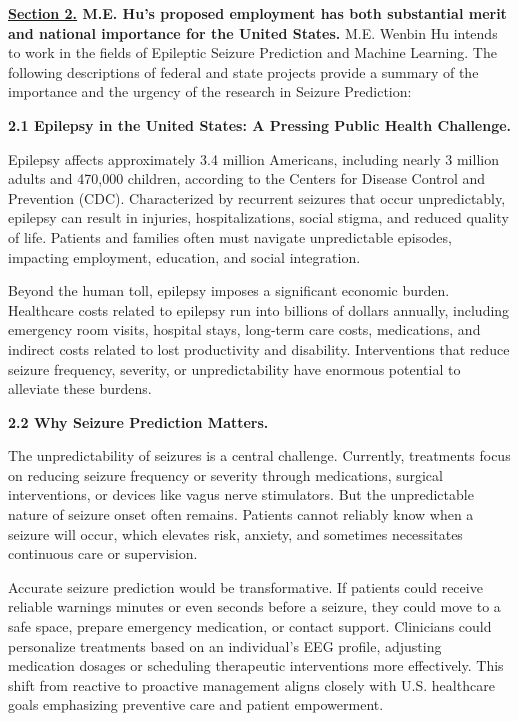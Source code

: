 \documentclass{article}
\begin{document}
\clearpage


{\bf \underline{Section 2.} M.E. Hu’s proposed employment has both substantial merit and national importance for the United States.}
M.E. Wenbin Hu intends to work in the fields of Epileptic Seizure Prediction and Machine Learning. The following descriptions of federal and state projects provide a summary of the importance and the urgency of the research in  Seizure Prediction:

{\bf 2.1 Epilepsy in the United States: A Pressing Public Health Challenge. }

Epilepsy affects approximately 3.4 million Americans, including nearly 3 million adults and 470,000 children, according to the Centers for Disease Control and Prevention (CDC). Characterized by recurrent seizures that occur unpredictably, epilepsy can result in injuries, hospitalizations, social stigma, and reduced quality of life. Patients and families often must navigate unpredictable episodes, impacting employment, education, and social integration.

Beyond the human toll, epilepsy imposes a significant economic burden. Healthcare costs related to epilepsy run into billions of dollars annually, including emergency room visits, hospital stays, long-term care costs, medications, and indirect costs related to lost productivity and disability. Interventions that reduce seizure frequency, severity, or unpredictability have enormous potential to alleviate these burdens.


{\bf 2.2 Why Seizure Prediction Matters. }

The unpredictability of seizures is a central challenge. Currently, treatments focus on reducing seizure frequency or severity through medications, surgical interventions, or devices like vagus nerve stimulators. But the unpredictable nature of seizure onset often remains. Patients cannot reliably know when a seizure will occur, which elevates risk, anxiety, and sometimes necessitates continuous care or supervision.

Accurate seizure prediction would be transformative. If patients could receive reliable warnings minutes or even seconds before a seizure, they could move to a safe space, prepare emergency medication, or contact support. Clinicians could personalize treatments based on an individual’s EEG profile, adjusting medication dosages or scheduling therapeutic interventions more effectively. This shift from reactive to proactive management aligns closely with U.S. healthcare goals emphasizing preventive care and patient empowerment.
\end{document}

